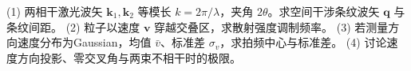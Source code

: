 (1) 两相干激光波矢 \(\mathbf k_1,\mathbf k_2\) 等模长 \(k=2\pi/\lambda\)，夹角 \(2\theta\)。求空间干涉条纹波矢 \(\mathbf q\) 与条纹间距。
(2) 粒子以速度 \(\mathbf v\) 穿越交叠区，求散射强度调制频率。
(3) 若测量方向速度分布为Gaussian，均值 \(\bar v\)、标准差 \(\sigma_v\)，求拍频中心与标准差。
(4) 讨论速度方向投影、零交叉角与两束不相干时的极限。
